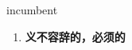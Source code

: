 
\begin{frame}
{\huge incumbent}
\begin{center}
\begin{enumerate}\Large
  \item \textbf{义不容辞的，必须的}
\end{enumerate}
\end{center}
\end{frame}
